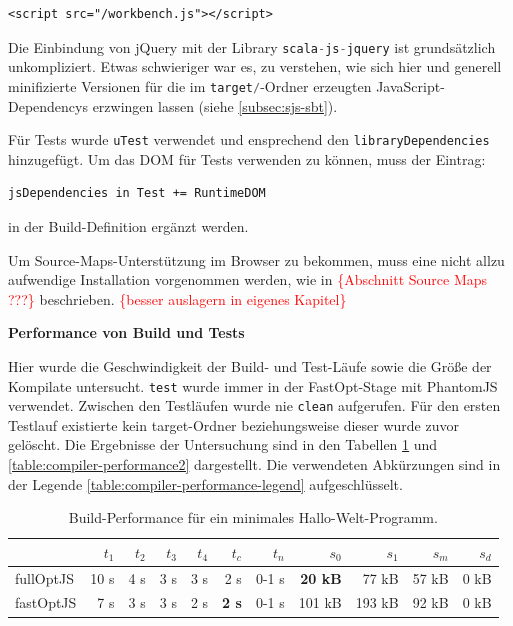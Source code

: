 \documentclass[a4paper, 12pt, hidelinks, listof=totoc, listoftables=totoc, bibliography=totoc]{scrreprt}
\newcommand{\code}[1]{\lstinline[language=Scala, style=inline]|#1|}
\newcommand{\TODOi}[1]{\textcolor{red}{\{#1\}}}
\newcommand{\MyMiniSec}[1]{\rmfamily\fontsize{12}{15}\selectfont
	\vspace{7pt}\textbf{#1} %
}
\begin{document}
\begin{lstlisting}[language=HTML5, style=snippet]
<script src="/workbench.js"></script>
\end{lstlisting}

Die Einbindung von jQuery mit der Library \code{scala-js-jquery} ist grundsätzlich unkompliziert. Etwas schwieriger war es, zu verstehen, wie sich hier und generell minifizierte Versionen für die im \code{target/}-Ordner erzeugten JavaScript-Dependencys erzwingen lassen (siehe \ref{subsec:sjs-sbt}).

Für Tests wurde \code{uTest} verwendet und ensprechend den \code{libraryDependencies} hinzugefügt. Um das \ac{DOM} für Tests verwenden zu können, muss der Eintrag:

\begin{lstlisting}[style=snippet]
jsDependencies in Test += RuntimeDOM
\end{lstlisting}
in der Build-Definition ergänzt werden.

Um Source-Maps-Unterstützung im Browser zu bekommen, muss eine nicht allzu aufwendige Installation vorgenommen werden, wie in \TODOi{Abschnitt Source Maps ???} beschrieben. \TODOi{besser auslagern in eigenes Kapitel}

\MyMiniSec{Performance von Build und Tests}

Hier wurde die Geschwindigkeit der Build- und Test-Läufe sowie die Größe der Kompilate untersucht. \code{test} wurde immer in der FastOpt-Stage mit PhantomJS verwendet. Zwischen den Testläufen wurde nie \code{clean} aufgerufen. Für den ersten Testlauf existierte kein target-Ordner beziehungsweise dieser wurde zuvor gelöscht. Die Ergebnisse der Untersuchung sind in den Tabellen \ref{table:compiler-performance1} und \ref{table:compiler-performance2} dargestellt. Die verwendeten Abkürzungen sind in der Legende \ref{table:compiler-performance-legend} aufgeschlüsselt.

\medskip

\begin{table}[!h]
\begin{tabular}{|l|r|r|r|r|r|r||r|r|r|r|}
\hline           & $t_1$ & $t_2$ & $t_3$ & $t_4$ & $t_c$         & $t_n$ & $s_0$          & $s_1$  & $s_m$ & $s_d$ \\ 
\hline fullOptJS & 10 s  &  4 s  &  3 s  &  3 s  &          2 s  & 0-1 s & \textbf{20 kB} &  77 kB & 57 kB &  0 kB \\ 
\hline fastOptJS &  7 s  &  3 s  &  3 s  &  2 s  &  \textbf{2 s} & 0-1 s &        101 kB  & 193 kB & 92 kB &  0 kB \\ 
\hline 
\end{tabular} 
\caption{Build-Performance für ein minimales Hallo-Welt-Programm.}
\label{table:compiler-performance1}
\end{table}
\end{document}
